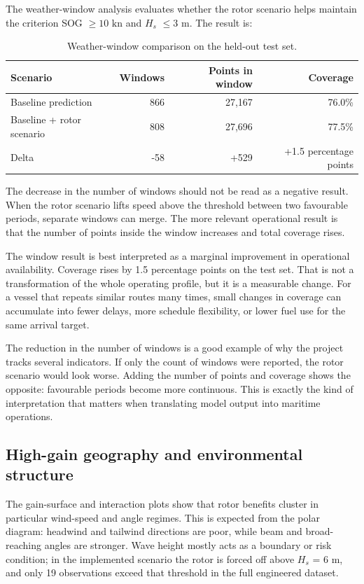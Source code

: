 \documentclass[10pt,a4paper]{article}
\newcommand{\kn}{\ensuremath{\mathrm{kn}}}
\newcommand{\hs}{$H_s$}
\newcommand{\sog}{SOG}
\begin{document}
The weather-window analysis evaluates whether the rotor scenario helps maintain
the criterion \sog{} $\geq 10$ \kn{} and \hs{} $\leq 3$ m. The result is:

\begin{table}[H]
\centering
\caption{Weather-window comparison on the held-out test set.}
\begin{tabular}{lrrr}
\toprule
\textbf{Scenario} & \textbf{Windows} & \textbf{Points in window} & \textbf{Coverage} \\
\midrule
Baseline prediction & 866 & 27,167 & 76.0\% \\
Baseline + rotor scenario & 808 & 27,696 & 77.5\% \\
Delta & -58 & +529 & +1.5 percentage points \\
\bottomrule
\end{tabular}
\end{table}

The decrease in the number of windows should not be read as a negative result.
When the rotor scenario lifts speed above the threshold between two favourable
periods, separate windows can merge. The more relevant operational result is
that the number of points inside the window increases and total coverage rises.

The window result is best interpreted as a marginal improvement in operational
availability. Coverage rises by 1.5 percentage points on the test set. That is
not a transformation of the whole operating profile, but it is a measurable
change. For a vessel that repeats similar routes many times, small changes in
coverage can accumulate into fewer delays, more schedule flexibility, or lower
fuel use for the same arrival target.

The reduction in the number of windows is a good example of why the project
tracks several indicators. If only the count of windows were reported, the rotor
scenario would look worse. Adding the number of points and coverage shows the
opposite: favourable periods become more continuous. This is exactly the kind of
interpretation that matters when translating model output into maritime
operations.

\subsection{High-gain geography and environmental structure}

The gain-surface and interaction plots show that rotor benefits cluster in
particular wind-speed and angle regimes. This is expected from the polar diagram:
headwind and tailwind directions are poor, while beam and broad-reaching angles
are stronger. Wave height mostly acts as a boundary or risk condition; in the
implemented scenario the rotor is forced off above \hs{} = 6 m, and only 19
observations exceed that threshold in the full engineered dataset.
\end{document}
